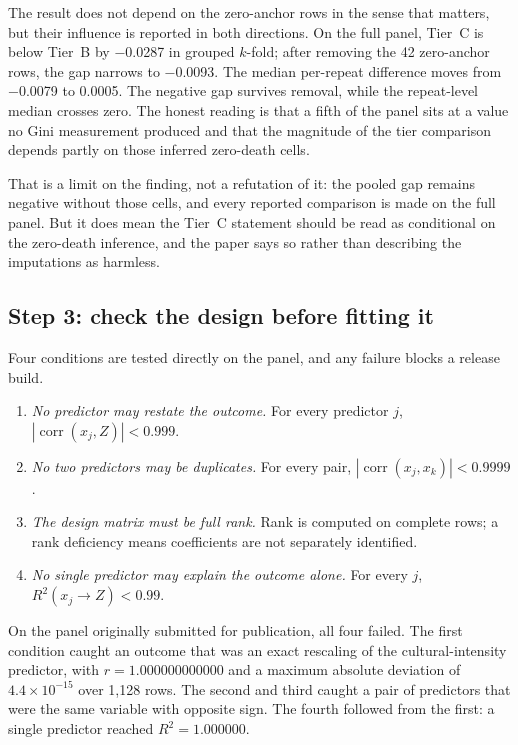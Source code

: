 \documentclass[11pt]{article}
\begin{document}
The result does not depend on the zero-anchor rows in the sense that matters, but their influence is reported in both directions. On the full panel, Tier~C is below Tier~B by \num{-0.0287} in grouped $k$-fold; after removing the \num{42} zero-anchor rows, the gap narrows to \num{-0.0093}. The median per-repeat difference moves from \num{-0.0079} to \num{+0.0005}. The negative gap survives removal, while the repeat-level median crosses zero. The honest reading is that a fifth of the panel sits at a value no Gini measurement produced and that the magnitude of the tier comparison depends partly on those inferred zero-death cells.

That is a limit on the finding, not a refutation of it: the pooled gap remains negative without those cells, and every reported comparison is made on the full panel. But it does mean the Tier~C statement should be read as conditional on the zero-death inference, and the paper says so rather than describing the imputations as harmless.

\subsection*{Step 3: check the design before fitting it}
Four conditions are tested directly on the panel, and any failure blocks a release build.

\begin{enumerate}
\item \emph{No predictor may restate the outcome.} For every predictor $j$, $|\operatorname{corr}(x_j, Z)| < 0.999$.
\item \emph{No two predictors may be duplicates.} For every pair, $|\operatorname{corr}(x_j, x_k)| < 0.9999$.
\item \emph{The design matrix must be full rank.} Rank is computed on complete rows; a rank deficiency means coefficients are not separately identified.
\item \emph{No single predictor may explain the outcome alone.} For every $j$, $R^2(x_j \to Z) < 0.99$.
\end{enumerate}

On the panel originally submitted for publication, all four failed. The first condition caught an outcome that was an exact rescaling of the cultural-intensity predictor, with $r = 1.000000000000$ and a maximum absolute deviation of $4.4\times10^{-15}$ over 1{,}128 rows. The second and third caught a pair of predictors that were the same variable with opposite sign. The fourth followed from the first: a single predictor reached $R^2 = 1.000000$.
\end{document}

